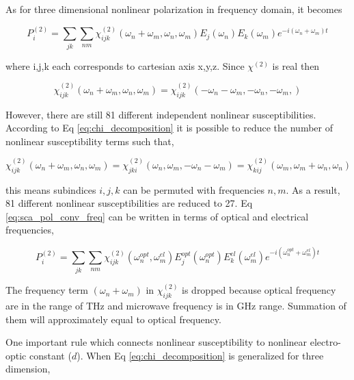 \documentclass[thesis]{deutez}
\begin{document}
    As for three dimensional nonlinear polarization in frequency domain, it becomes

    \begin{equation}
        P_i^{(2)} = \sum_{jk}\sum_{nm} \chi^{(2)}_{ijk}(\omega_n+\omega_m, \omega_n, \omega_m) E_j(\omega_n)E_k(\omega_m)e^{-i(\omega_n+\omega_m)t}
        \label{eq:sca_pol_conv_freq}
    \end{equation}

    where i,j,k each corresponds to cartesian axis x,y,z. Since $\chi^{(2)}$ is real then
    
    \begin{equation}
        \chi^{(2)}_{ijk}(\omega_n+\omega_m,\omega_n,\omega_m) = \chi^{(2)}_{ijk}(-\omega_n-\omega_m,-\omega_n,-\omega_m,)
        \label{eq:chi-real-condi}
    \end{equation}
    
    However, there are still 81 different independent nonlinear susceptibilities.  According to Eq \ref{eq:chi_decomposition} it is possible to reduce the number of nonlinear susceptibility terms such that,
    
    \begin{equation}
        \chi^{(2)}_{ijk}(\omega_n+\omega_m,\omega_n,\omega_m) = \chi^{(2)}_{jki}(\omega_n,\omega_m,-\omega_n-\omega_m) = \chi^{(2)}_{kij}(\omega_m,\omega_m+\omega_n,\omega_n)
        \label{eq:index_reducation}
    \end{equation}

    this means subindices $i,j,k$ can be permuted with frequencies $n,m$. As a result, 81 different nonlinear susceptibilities are reduced to 27. Eq \ref{eq:sca_pol_conv_freq} can be written in terms of optical and electrical frequencies,

    \begin{equation}
        P_i^{(2)} = \sum_{jk}\sum_{nm} \chi^{(2)}_{ijk}(\omega^{opt}_n, \omega^{el}_m) E^{opt}_j(\omega^{opt}_n)E^{el}_k(\omega^{el}_m)e^{-i(\omega^{opt}_n+\omega^{el}_m)t}
        \label{eq:sca_pol_conv_freq_opt_el}
    \end{equation}

    The frequency term $(\omega_n+\omega_m)$ in $\chi^{(2)}_{ijk}$ is dropped because optical frequency are in the range of THz and microwave frequency is in GHz range. Summation of them will approximately equal to optical frequency. 
    
    One important rule which connects nonlinear susceptibility to nonlinear electro-optic constant ($d$). When Eq \ref{eq:chi_decomposition} is generalized for three dimension,
\end{document}
